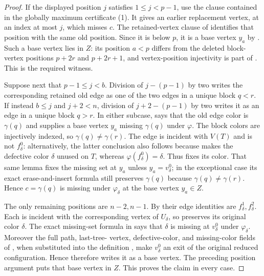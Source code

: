\begin{proof}
If the displayed position $j$ satisfies $1\le j<p-1$, use the
 clause contained in the globally maximum
certificate (1).  It gives an earlier replacement vertex, at an index at
most $j$, which misses $c$.  The retained-vertex clause of
 identifies that position with the same
old position.  Since it is below $p$, it is a base vertex $y_a$ by
.  Such a base vertex lies in
$Z$: its position $a<p$ differs from the deleted block-vertex positions
$p+2r$ and $p+2r+1$, and vertex-position injectivity is part of
.  This is the required witness.

Suppose next that $p-1\le j<b$.  Division of $j-(p-1)$ by two writes the
corresponding retained old edge as one of the two edges in a unique block
$q<r$.  If instead $b\le j$ and $j+2<n$, division of
$j+2-(p-1)$ by two writes it as an edge in a unique block $q>r$.
In either subcase,  says that
the old edge color is $\gamma(q)$ and supplies a base vertex $y_a$
missing $\gamma(q)$ under $\varphi$.  The block colors are injectively
indexed, so $\gamma(q)\ne\gamma(r)$.  The edge is incident with
$V(T)$ and is not $f^0_\delta$: alternatively, the latter conclusion
also follows because  makes the
defective color $\delta$ unused on $T$, whereas
$\varphi(f^0_\delta)=\delta$.  Thus
 fixes its color.  That same lemma
fixes the missing set at $y_a$ unless $y_a=v^0_\delta$; in the exceptional
case its exact erase-and-insert formula still preserves
$\gamma(q)$ because $\gamma(q)\ne\gamma(r)$.  Hence $c=\gamma(q)$ is
missing under $\varphi_\delta$ at the base vertex $y_a\in Z$.

The only remaining positions are $n-2,n-1$.  By
 their edge identities are
$f^1_\delta,f^2_\delta$.  Each is incident with the corresponding
vertex of $U_\delta$, so
 preserves its original color
$\delta$.  The exact missing-set formula in
 says that $\delta$ is missing at
$v^0_\delta$ under $\varphi_\delta$.  Moreover the full path, last-tree-
vertex, defective-color, and missing-color fields of
, when substituted into the definition
, make $v^0_\delta$ an exit of the original
reduced configuration.  Hence
 therefore writes it as a base
vertex.  The preceding position argument puts that base vertex in $Z$.
This proves the claim in every case.


\end{proof}
